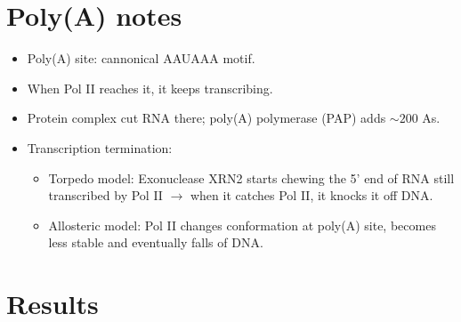 \documentclass{article}
\begin{document}
	\section*{Poly(A) notes}
	\begin{itemize}
		\item Poly(A) site: cannonical AAUAAA motif.
		\item When Pol II reaches it, it keeps transcribing.
		\item Protein complex cut RNA there; poly(A) polymerase (PAP) adds $\sim 200$ As.
		\item Transcription termination:
		\begin{itemize}
				\item Torpedo model: Exonuclease XRN2 starts chewing the 5' end of RNA still transcribed by Pol II $\to$ when it catches Pol II, it knocks it off DNA.
				\item Allosteric model: Pol II changes conformation at poly(A) site, becomes less stable and eventually falls of DNA.
		\end{itemize}
	\end{itemize}
	
	\section{Results}
\end{document}
